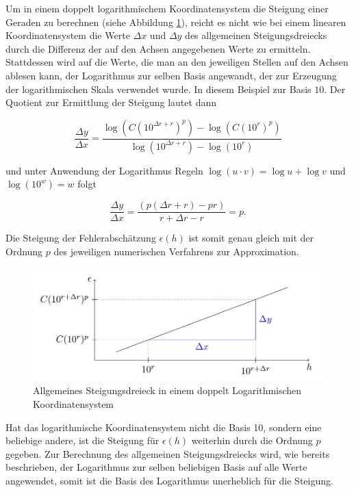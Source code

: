 Um in einem doppelt logarithmischem Koordinatensystem die Steigung einer Geraden zu berechnen (siehe Abbildung \ref{steigung}), reicht es nicht wie bei einem linearen Koordinatensystem die Werte $\Delta x$ und $\Delta y$ des allgemeinen Steigungsdreiecks durch die Differenz der auf den Achsen angegebenen Werte zu ermitteln.\\
Stattdessen wird auf die Werte, die man an den jeweiligen Stellen auf den Achsen ablesen kann, der Logarithmus zur selben Basis angewandt, der zur Erzeugung der logarithmischen Skala verwendet wurde. In diesem Beispiel zur Basis $10$. Der Quotient zur Ermittlung der Steigung lautet dann 

\begin{equation*}
	\frac{\Delta y}{\Delta x} = \frac{\log(C (10^{\Delta r +r})^p)-\log(C (10^r)^p)}{\log(10^{\Delta r +r}) - \log(10^r)}
\end{equation*} 

und unter Anwendung der Logarithmus Regeln $\log(u\cdot v) = \log u + \log v$ und $\log (10^w) = w$ folgt

\begin{equation*}
	\frac{\Delta y}{\Delta x} = \frac{(p(\Delta r +r)-pr)}{r+\Delta r -r}
	=p.
\end{equation*}

Die Steigung der Fehlerabschätzung $\epsilon (h)$ ist somit genau gleich mit der Ordnung $p$ des jeweiligen numerischen Verfahrens zur Approximation.

\begin{figure}[htpb]
	\includegraphics[width=\textwidth]{data/SteigungLogPlot}
	\caption{Allgemeines Steigungsdreieck in einem doppelt Logarithmischen Koordinatensystem}
	\label{steigung}
\end{figure}

Hat das logarithmische Koordinatensystem nicht die Basis 10, sondern eine beliebige andere, ist die Steigung für $\epsilon (h)$ weiterhin durch die Ordnung $p$ gegeben. Zur Berechnung des allgemeinen Steigungsdreiecks wird, wie bereits beschrieben, der Logarithmus zur selben beliebigen Basis auf alle Werte angewendet, somit ist die Basis des Logarithmus unerheblich für die Steigung.





